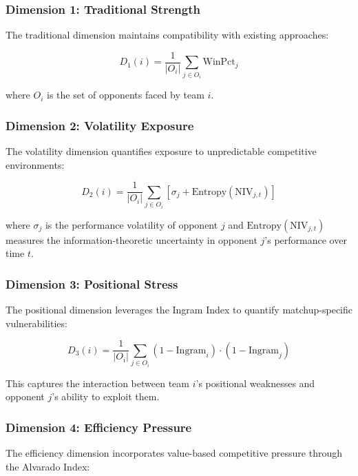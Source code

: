 \documentclass[11pt]{article}
\begin{document}
\subsubsection{Dimension 1: Traditional Strength}

The traditional dimension maintains compatibility with existing approaches:

\begin{equation}
D_1(i) = \frac{1}{|O_i|} \sum_{j \in O_i} \text{WinPct}_j
\end{equation}

where $O_i$ is the set of opponents faced by team $i$.

\subsubsection{Dimension 2: Volatility Exposure}

The volatility dimension quantifies exposure to unpredictable competitive environments:

\begin{equation}
D_2(i) = \frac{1}{|O_i|} \sum_{j \in O_i} [\sigma_j + \text{Entropy}(\text{NIV}_{j,t})]
\end{equation}

where $\sigma_j$ is the performance volatility of opponent $j$ and $\text{Entropy}(\text{NIV}_{j,t})$ measures the information-theoretic uncertainty in opponent $j$'s performance over time $t$.

\subsubsection{Dimension 3: Positional Stress}

The positional dimension leverages the Ingram Index to quantify matchup-specific vulnerabilities:

\begin{equation}
D_3(i) = \frac{1}{|O_i|} \sum_{j \in O_i} (1 - \text{Ingram}_i) \cdot (1 - \text{Ingram}_j)
\end{equation}

This captures the interaction between team $i$'s positional weaknesses and opponent $j$'s ability to exploit them.

\subsubsection{Dimension 4: Efficiency Pressure}

The efficiency dimension incorporates value-based competitive pressure through the Alvarado Index:
\end{document}
